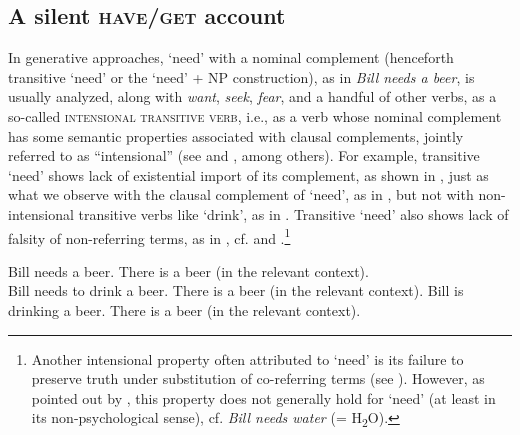 \documentclass[output=paper]{langscibook}
\begin{document}
\subsection{A silent \textsc{have/get} account}\label{section-silent-have}

In generative approaches, `need' with a nominal complement (henceforth transitive `need' or the `need' + NP construction), as in \textit{Bill needs a beer}, is usually analyzed, along with \textit{want}, \textit{seek}, \textit{fear}, and a handful of other verbs, as a so-called \textsc{intensional transitive verb}, i.e., as a verb whose nominal complement has some semantic properties associated with clausal complements, jointly referred to as ``intensional'' (see \citealt{denDikken.Larson.Ludlow2018} and \citealt{Schwarz2006}, among others). For example, transitive `need' shows lack of existential import of its complement, as shown in , just as what we observe with the clausal complement of `need', as in , but not with non-intensional transitive verbs like `drink', as in . Transitive `need' also shows lack of falsity of non-referring terms, as in , cf.  and .\footnote{ Another intensional property often attributed to `need' is its failure to preserve truth under substitution of co-referring terms (see \citealt{denDikken.Larson.Ludlow2018,Harves2008}). However, as pointed out by \citet{Forbes2020}, this property does not generally hold for `need' (at least in its non-psychological sense), cf. \textit{Bill needs water} (= H\textsubscript{2}O).}

    \largerpage[-2] %

\ea
\ea Bill needs a beer. {\nRightarrow} There is a beer (in the relevant context).\label{need-intensional}\\ \hfill \citep[259]{Schwarz2006}
\ex Bill needs to drink a beer. {\nRightarrow} There is a beer (in the relevant context).\label{need-infinitival}
\ex Bill is drinking a beer. {\Rightarrow} There is a beer  (in the relevant context).\label{non-intensional}
\z\z

\end{document}
